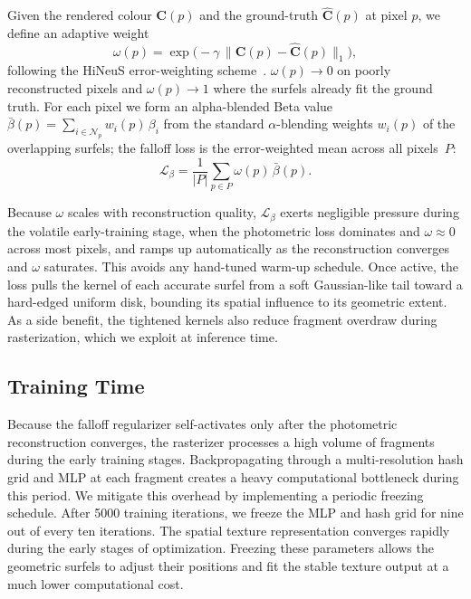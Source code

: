 \documentclass[acmtog,anonymous,review]{acmart}
\begin{document}
Given the rendered colour $\mathbf{C}(p)$ and the ground-truth
$\hat{\mathbf{C}}(p)$ at pixel $p$, we define an adaptive weight
\begin{equation}
\omega(p) = \exp\!\big(-\gamma\, \|\mathbf{C}(p) - \hat{\mathbf{C}}(p)\|_1\big),
\end{equation}
following the HiNeuS error-weighting scheme~\cite{TODO_hineus_citation}.
$\omega(p) \to 0$ on poorly reconstructed pixels and $\omega(p) \to 1$
where the surfels already fit the ground truth. For each pixel we form
an alpha-blended Beta value
$\bar{\beta}(p) = \sum_{i \in \mathcal{N}_p} w_i(p)\, \beta_i$
from the standard $\alpha$-blending weights $w_i(p)$ of the overlapping
surfels; the falloff loss is the error-weighted mean across all
pixels~$P$:
\begin{equation}
\mathcal{L}_{\beta} = \frac{1}{|P|} \sum_{p \in P} \omega(p)\, \bar{\beta}(p).
\end{equation}

Because $\omega$ scales with reconstruction quality, $\mathcal{L}_\beta$
exerts negligible pressure during the volatile early-training stage, when
the photometric loss dominates and $\omega \approx 0$ across most pixels,
and ramps up automatically as the reconstruction converges and $\omega$
saturates. This avoids any hand-tuned warm-up schedule.
Once active, the loss pulls the kernel of each accurate surfel from a
soft Gaussian-like tail toward a hard-edged uniform disk, bounding its
spatial influence to its geometric extent. As a side benefit, the
tightened kernels also reduce fragment overdraw during rasterization,
which we exploit at inference time.

\subsection{Training Time}

Because the falloff regularizer self-activates only after the photometric reconstruction converges, the rasterizer processes a high volume of fragments during the early training stages. Backpropagating through a multi-resolution hash grid and MLP at each fragment creates a heavy computational bottleneck during this period. We mitigate this overhead by implementing a periodic freezing schedule. After 5000 training iterations, we freeze the MLP and hash grid for nine out of every ten iterations. The spatial texture representation converges rapidly during the early stages of optimization. Freezing these parameters allows the geometric surfels to adjust their positions and fit the stable texture output at a much lower computational cost.
\end{document}

